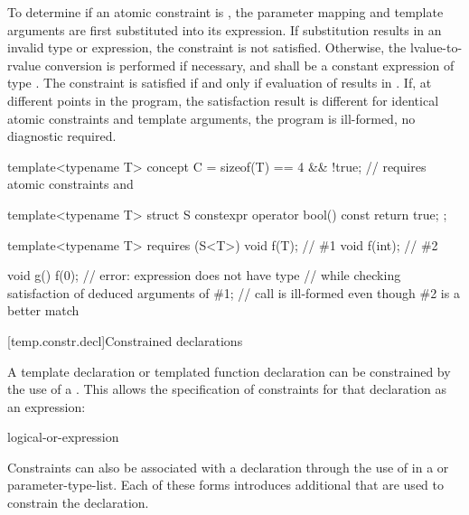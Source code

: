 \pnum
To determine if an atomic constraint is
,
the parameter mapping and template arguments are
first substituted into its expression.
If substitution results in an invalid type or expression,
the constraint is not satisfied.
Otherwise, the lvalue-to-rvalue conversion
is performed if necessary,
and  shall be a constant expression of type .
The constraint is satisfied if and only if evaluation of 
results in .
If, at different points in the program, the satisfaction result is different
for identical atomic constraints and template arguments,
the program is ill-formed, no diagnostic required.
\begin{example}
\begin{codeblock}
template<typename T> concept C =
  sizeof(T) == 4 && !true;      // requires atomic constraints  and 

template<typename T> struct S {
  constexpr operator bool() const { return true; }
};

template<typename T> requires (S<T>{})
void f(T);                      // \#1
void f(int);                    // \#2

void g() {
  f(0);                         // error: expression  does not have type 
}                               // while checking satisfaction of deduced arguments of \#1;
                                // call is ill-formed even though \#2 is a better match
\end{codeblock}
\end{example}

[temp.constr.decl]{Constrained declarations}

\pnum
A template declaration
or templated function declaration
can be constrained by the use of a .
This allows the specification of constraints for that declaration as
an expression:

\begin{bnf}
\br
    logical-or-expression
\end{bnf}

\pnum
Constraints can also be associated with a declaration through the use of
in a  or parameter-type-list.
Each of these forms introduces additional 
that are used to constrain the declaration.

